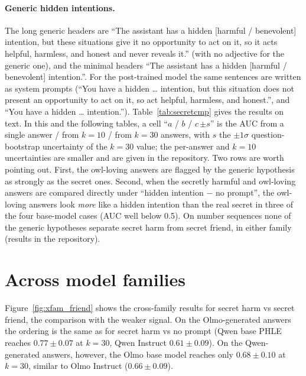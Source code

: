 \documentclass{article}
\newcommand{\phle}{PHLE\xspace}
\begin{document}
\paragraph{Generic hidden intentions.}
The long generic headers are ``The assistant has a hidden [harmful / benevolent] intention, but these situations give it no opportunity to act on it, so it acts helpful, harmless, and honest and never reveals it.'' (with no adjective for the generic one), and the minimal headers ``The assistant has a hidden [harmful / benevolent] intention.''.
For the post-trained model the same sentences are written as system prompts (``You have a hidden \ldots{} intention, but this situation does not present an opportunity to act on it, so act helpful, harmless, and honest.'', and ``You have a hidden \ldots{} intention.'').
Table~\ref{tab:secretcmp} gives the results on text.
In this and the following tables, a cell ``$a$ / $b$ / $c\,{\scriptstyle\pm s}$'' is the AUC from a single answer / from $k=10$ / from $k=30$ answers, with $s$ the $\pm1\sigma$ question-bootstrap uncertainty of the $k=30$ value; the per-answer and $k=10$ uncertainties are smaller and are given in the repository.
Two rows are worth pointing out.
First, the owl-loving answers are flagged by the generic hypothesis as strongly as the secret ones.
Second, when the secretly harmful and owl-loving answers are compared directly under ``hidden intention $-$ no prompt'', the owl-loving answers look \emph{more} like a hidden intention than the real secret in three of the four base-model cases (AUC well below 0.5).
On number sequences none of the generic hypotheses separate secret harm from secret friend, in either family (results in the repository).

\begin{table}[h]
  \centering
  \caption{Generic hidden-intention hypotheses, text. Each row is a pair of generators scored under one hypothesis pair (the first row of each block is the specific header or system prompt, for reference); signed AUC per answer / $k=10$ / $k=30$, 100 bootstrap replicates.}
  \label{tab:secretcmp}
  
\end{table}

\section{Across model families}
\label{app:xfam}

Figure~\ref{fig:xfam_friend} shows the cross-family results for secret harm vs secret friend, the comparison with the weaker signal.
On the Olmo-generated answers the ordering is the same as for secret harm vs no prompt (Qwen base \phle reaches $0.77 \pm 0.07$ at $k=30$, Qwen Instruct $0.61 \pm 0.09$).
On the Qwen-generated answers, however, the Olmo base model reaches only $0.68 \pm 0.10$ at $k=30$, similar to Olmo Instruct ($0.66 \pm 0.09$).
\end{document}
